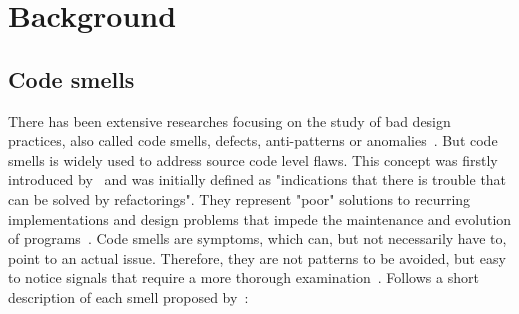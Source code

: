 \section{Background}

\subsection{Code smells}

There has been extensive researches focusing on the study of bad design practices, also called code smells, defects, anti-patterns or anomalies~\citep{sahin2014code}. But code smells is widely used to address source code level flaws. This concept was firstly introduced by~\citet{fowler1999refactoring} and was initially defined as "indications that there is trouble that can be solved by refactorings". They represent "poor" solutions to recurring implementations and design problems that impede the maintenance and evolution of programs~\citep{khomh2011}. Code smells are symptoms, which can, but not necessarily have to, point to an actual issue. Therefore, they are not patterns to be avoided, but easy to notice signals that require a more thorough examination~\citep{walter2016relationship}.  Follows a short description of each smell proposed by~\citet{fowler1999refactoring}:
